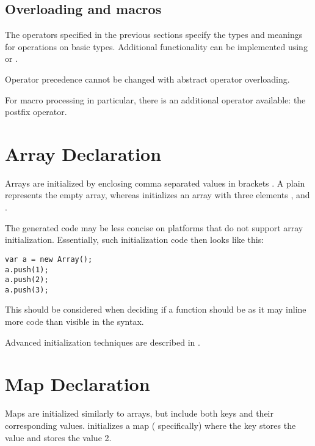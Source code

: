 \subsection{Overloading and macros}
\label{expression-operators-overloading}

The operators specified in the previous sections specify the types and meanings for operations on basic types. Additional functionality can be implemented using  or .

Operator precedence cannot be changed with abstract operator overloading.

For macro processing in particular, there is an additional operator available: the postfix \expr{!} operator.


\section{Array Declaration}
\label{expression-array-declaration}

Arrays are initialized by enclosing comma \expr{,} separated values in brackets \expr{[]}. A plain \expr{[]} represents the empty array, whereas \expr{[1, 2, 3]} initializes an array with three elements ,  and .

The generated code may be less concise on platforms that do not support array initialization. Essentially, such initialization code then looks like this:

\begin{lstlisting}
var a = new Array();
a.push(1);
a.push(2);
a.push(3);
\end{lstlisting}
This should be considered when deciding if a function should be  as it may inline more code than visible in the syntax.

Advanced initialization techniques are described in .

\section{Map Declaration}
\label{expression-map-declaration}

Maps are initialized similarly to arrays, but include both keys and their corresponding values. \expr{["example" => 1, "data" => 2]} initializes a map ( specifically) where the key  stores the value  and  stores the value 2.

